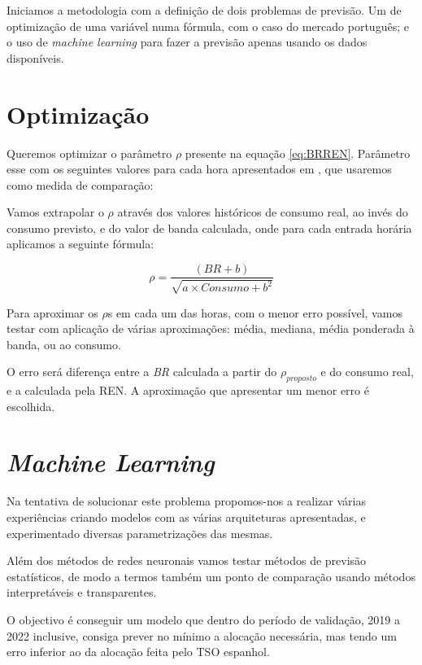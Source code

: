 
Iniciamos a metodologia com a definição de dois problemas de previsão. Um de optimização de uma variável numa fórmula, com o caso do mercado português; e o uso de \textit{machine learning} para fazer a previsão apenas usando os dados disponíveis.\par

\section{Optimização}

Queremos optimizar o parâmetro $\rho$ presente na equação \ref{eq:BRREN}. Parâmetro esse com os seguintes valores para cada hora apresentados em \cite{Carneiro2016}, que usaremos como medida de comparação:\par
\begin{table}[H] \centering \caption{Valores de $\rho$ apresentado em \cite{Carneiro2016}}  \end{table}

Vamos extrapolar o $\rho$ através dos valores históricos de consumo real, ao invés do consumo previsto, e do valor de banda calculada, onde para cada entrada horária aplicamos a seguinte fórmula:\par
\begin{equation} \label{eq:rhoproposed} 
    \rho  = \frac{(BR + b)}{\sqrt{a \times Consumo + b^{2}}}
\end{equation}

Para aproximar os $\rho$s em cada um das horas, com o menor erro possível, vamos testar com aplicação de várias aproximações: média, mediana, média ponderada à banda, ou ao consumo.\par
O erro será diferença entre a \textit{BR} calculada a partir do $\rho_{proposto}$ e do consumo real, e a  calculada pela \gls{REN}. A aproximação que apresentar um menor erro é escolhida.\par


\section{\textit{Machine Learning}}

Na tentativa de solucionar este problema propomos-nos a realizar várias experiências criando modelos com as várias arquiteturas apresentadas, e experimentado diversas parametrizações das mesmas.\par
Além dos métodos de redes neuronais vamos testar métodos de previsão estatísticos, de modo a termos também um ponto de comparação usando métodos interpretáveis e transparentes.\par
O objectivo é conseguir um modelo que dentro do período de validação, 2019 a 2022 inclusive, consiga prever no mínimo a alocação necessária, mas tendo um erro inferior ao da alocação feita pelo \gls{TSO} espanhol.\par


\thispagestyle{plain}
 \label{se:metstats}


\thispagestyle{plain}
 \label{se:metneuralnet}

% 

